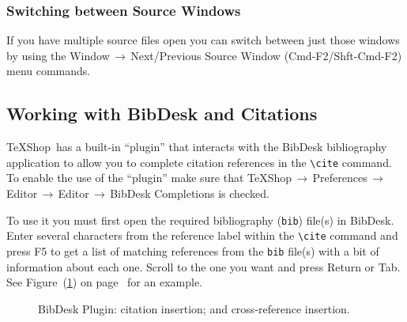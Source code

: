 \documentclass[letterpaper,11pt]{article}
\newcommand{\TS}{\textsf{\TeX Shop}}
\newcommand{\cmd}[1]{\textsf{#1}}
\newcommand{\mnu}[1]{\textsf{#1}}
\newcommand{\To}{\,\(\to\)\,}
\begin{document}
\subsubsection{Switching between Source Windows}

If you have multiple source files open you can switch between just those windows by using the \mnu{Window}\To\mnu{Next/Previous Source Window} (\cmd{Cmd-F2}/\cmd{Shft-Cmd-F2}) menu commands.

\subsection{Working with \cmd{BibDesk} and Citations}

\TS\ has a built-in ``plugin'' that interacts with the \cmd{BibDesk} bibliography application to allow you to complete citation references in the \verb|\cite| command.  To enable the use of the ``plugin'' make sure that \mnu{TeXShop}\To\mnu{Preferences}\To\mnu{Editor}\To\mnu{Editor}\To\mnu{BibDesk Completions} is checked. 

To use it you must first open the required bibliography (\texttt{bib}) file(s) in \cmd{BibDesk}. Enter several characters from the reference label within the \verb|\cite| command and press \cmd{F5} to get a list of matching references from the \texttt{bib} file(s) with a bit of information about each one. Scroll to the one you want and press \cmd{Return} or \cmd{Tab}. See Figure~(\ref{fig:bibdesk}) 
on page~\pageref{fig:bibdesk} for an example.

\begin{figure}
\centering
{}%
\qquad%
%
\caption[BibDesk Plugin Use.]{
BibDesk Plugin:  citation insertion; and
 cross-reference insertion.}
\label{fig:bibdesk}
\end{figure}
\end{document}
